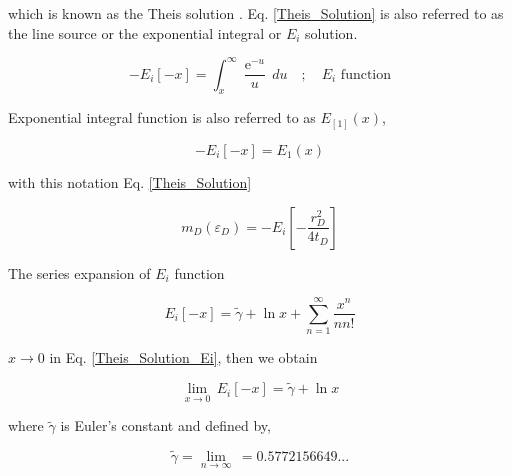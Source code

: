 \documentclass{llncs}
\numberwithin{equation}{section}
\numberwithin{figure}{section}
\numberwithin{table}{section}
\begin{document}
    which is known as the Theis solution \cite{Theis_1935_1}. Eq. \ref{Theis_Solution} is also referred to as the line source or the exponential integral or $E_{i}$ solution.


    \begin{equation*}
        -{{E}_{i}}\left[ -x \right]=\int_{x}^{\infty }{\frac{{{\operatorname{e}}^{-u}}}{u}}\,du\quad ;\quad {{E}_{i}}\text{ function}
    \end{equation*}

    Exponential integral function is also referred to as $E_[1](x)$,

    \begin{equation}
        -{{E}_{i}}\left[ -x \right]={{E}_{1}}\left( x \right)
        \label{Ei_E1}
    \end{equation}

    with this notation  Eq. \ref{Theis_Solution} 

    \begin{equation}
        {{ m }_{D}}\left( {{\varepsilon }_{D}} \right)=-{{E}_{i}}\left[ -\frac{r_{D}^{2}}{4{{t}_{D}}} \right]
        \label{Theis_Solution_Ei}
    \end{equation}

    The series expansion of $E_{i}$ function \cite{Abramowitz_1965_1}

    \begin{equation}
        {{E}_{i}}\left[ -x \right]=\widetilde{\gamma }+\ln x+\sum\limits_{n=1}^{\infty }{\frac{{{x}^{n}}}{nn!}}
        \label{Ei_expansion}
    \end{equation}

     $x\rightarrow0$ in Eq. \ref{Theis_Solution_Ei}, then we obtain

    \begin{equation}
        \underset{x\to 0}{\mathop{\lim }}\,{{E}_{i}}\left[ -x \right]=\widetilde{\gamma }+\ln x
        \label{Ei_approx}
    \end{equation}

    where $\widetilde{\gamma }$ is  Euler's constant and defined by,

    \begin{equation}
        \widetilde{\gamma }=\underset{n\to \infty }{\mathop{\lim \left\{ \sum\limits_{k=1}^{n}{\frac{1}{k}-\ln \left( n \right)} \right\}}}\,=0.5772156649...
        \label{Eulers_constant}
    \end{equation}
\end{document}
